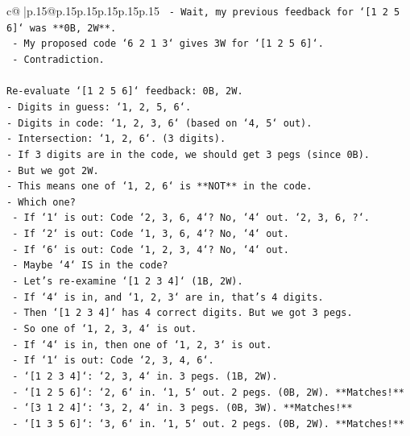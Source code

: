 \documentclass{article}
\begin{document}
{\begin{supertabular}{c@{$\;$}|p{.15\linewidth}@{}p{.15\linewidth}p{.15\linewidth}p{.15\linewidth}p{.15\linewidth}p{.15\linewidth}}
{{{\texttt{    {-} Wait, my previous feedback for `{[}1 2 5 6{]}` was **0B, 2W**.} \\
\texttt{    {-} My proposed code `6 2 1 3` gives 3W for `{[}1 2 5 6{]}`.} \\
\texttt{    {-} Contradiction.} \\
\\ 
\texttt{Re{-}evaluate `{[}1 2 5 6{]}` feedback: 0B, 2W.} \\
\texttt{{-} Digits in guess: `1, 2, 5, 6`.} \\
\texttt{{-} Digits in code: `1, 2, 3, 6` (based on `4, 5` out).} \\
\texttt{{-} Intersection: `1, 2, 6`. (3 digits).} \\
\texttt{{-} If 3 digits are in the code, we should get 3 pegs (since 0B).} \\
\texttt{{-} But we got 2W.} \\
\texttt{{-} This means one of `1, 2, 6` is **NOT** in the code.} \\
\texttt{{-} Which one?} \\
\texttt{    {-} If `1` is out: Code `2, 3, 6, 4`? No, `4` out. `2, 3, 6, ?`.} \\
\texttt{    {-} If `2` is out: Code `1, 3, 6, 4`? No, `4` out.} \\
\texttt{    {-} If `6` is out: Code `1, 2, 3, 4`? No, `4` out.} \\
\texttt{    {-} Maybe `4` IS in the code?} \\
\texttt{    {-} Let's re{-}examine `{[}1 2 3 4{]}` (1B, 2W).} \\
\texttt{        {-} If `4` is in, and `1, 2, 3` are in, that's 4 digits.} \\
\texttt{        {-} Then `{[}1 2 3 4{]}` has 4 correct digits. But we got 3 pegs.} \\
\texttt{        {-} So one of `1, 2, 3, 4` is out.} \\
\texttt{    {-} If `4` is in, then one of `1, 2, 3` is out.} \\
\texttt{    {-} If `1` is out: Code `2, 3, 4, 6`.} \\
\texttt{        {-} `{[}1 2 3 4{]}`: `2, 3, 4` in. 3 pegs. (1B, 2W).} \\
\texttt{        {-} `{[}1 2 5 6{]}`: `2, 6` in. `1, 5` out. 2 pegs. (0B, 2W). **Matches!**} \\
\texttt{        {-} `{[}3 1 2 4{]}`: `3, 2, 4` in. 3 pegs. (0B, 3W). **Matches!**} \\
\texttt{        {-} `{[}1 3 5 6{]}`: `3, 6` in. `1, 5` out. 2 pegs. (0B, 2W). **Matches!**} \\
}}}
\end{supertabular}}
\end{document}
